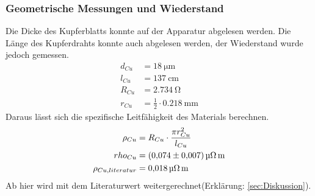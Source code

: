 \subsubsection{Geometrische Messungen und Wiederstand}
Die Dicke des Kupferblatts konnte auf der Apparatur abgelesen werden.
Die Länge des Kupferdrahts konnte auch abgelesen werden, der Wiederstand wurde jedoch gemessen.
\begin{align*}
    d_{Cu} &= \SI{18}{\micro \meter} \\
    l_{Cu} &= \SI{137}{\centi \meter}\\
    R_{Cu} &= \SI{2,734}{\ohm}\\
    r_{Cu} &= \frac{1}{2}\cdot \SI{0,218}{\milli \meter}
\end{align*}
Daraus lässt sich die spezifische Leitfähigkeit des Materials berechnen.
\begin{align*}
    \rho_{Cu} &= R_{Cu}\cdot \frac{\pi r_{Cu}^2}{l_{Cu}}\\
    rho_{Cu} &= \SI{0,074\pm0,007}{\micro \ohm \meter}\\
    \rho_{Cu,literatur} &= \SI{0,018}{\micro \ohm \meter} %
\end{align*}
Ab hier wird mit dem Literaturwert weitergerechnet(Erklärung: \ref{sec:Diskussion}).
